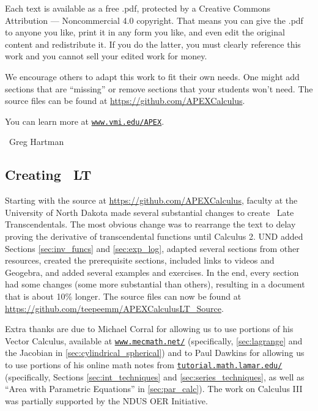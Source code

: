 \begin{itemize}
\begin{itemize}
Each text is available as a free .pdf, protected by a Creative Commons Attribution --- Noncommercial 4.0 copyright. That means you can give the .pdf to anyone you like, print it in any form you like, and even edit the original content and redistribute it. If you do the latter, you must clearly reference this work and you cannot sell your edited work for money.

We encourage others to adapt this work to fit their own needs. One might add sections that are ``missing'' or remove sections that your students won't need. The source files can be found at \url{https://github.com/APEXCalculus}.

You can learn more at \texttt{\href{http://www.vmi.edu/APEX}{www.vmi.edu/APEX}}.

~\hfill Greg Hartman

\subsection{Creating \apex~LT}

Starting with the source at \url{https://github.com/APEXCalculus},
faculty at the University of North Dakota made several substantial changes to create \apex\ Late Transcendentals.  The most obvious change was to rearrange the text to delay proving the derivative of transcendental functions until Calculus 2.  UND added Sections \ref{sec:inv_funcs} and \ref{sec:exp_log}, adapted several sections from other resources, created the prerequisite sections, included links to videos and Geogebra, and added several examples and exercises.  In the end, every section had some changes (some more substantial than others), resulting in a document that is about 10\% longer. The source files can now be found at\iflatexml\ \else\\\fi
\url{https://github.com/teepeemm/APEXCalculusLT_Source}.

Extra thanks are due
to Michael Corral for allowing us to use portions of his Vector Calculus, available at \texttt{\href{http://www.mecmath.net/}{www.mecmath.net/}}
(specifically, %
\autoref{sec:lagrange} and the Jacobian in \autoref{sec:cylindrical_spherical})
and
to Paul Dawkins for allowing us to use portions of his online math notes from \texttt{\href{http://tutorial.math.lamar.edu/}{tutorial.math.lamar.edu/}} (specifically, Sections \ref{sec:int_techniques} and \ref{sec:series_techniques}, as well as ``Area with Parametric Equations'' in \autoref{sec:par_calc}).
The work on Calculus III was partially supported by the NDUS OER Initiative.



\end{itemize}
\end{itemize}

